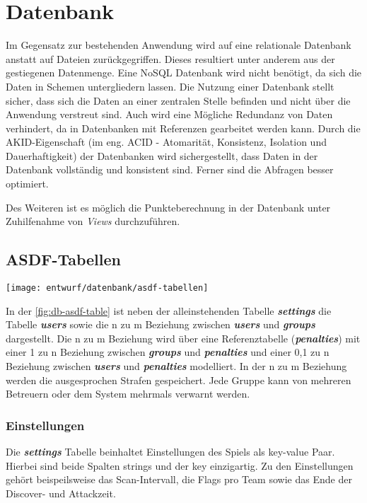 \section{Datenbank}
Im Gegensatz zur bestehenden Anwendung wird auf eine relationale Datenbank anstatt auf Dateien zurückgegriffen. Dieses resultiert unter anderem aus der gestiegenen Datenmenge. Eine NoSQL Datenbank wird nicht benötigt, da sich die Daten in Schemen untergliedern lassen. Die Nutzung einer Datenbank stellt sicher, dass sich die Daten an einer zentralen Stelle befinden und nicht über die Anwendung verstreut sind. Auch wird eine Mögliche Redundanz von Daten verhindert, da in Datenbanken mit Referenzen gearbeitet werden kann. Durch die AKID-Eigenschaft (im eng. ACID - Atomarität, Konsistenz, Isolation und Dauerhaftigkeit) der Datenbanken wird sichergestellt, dass Daten in der Datenbank vollständig und konsistent sind. Ferner sind die Abfragen besser optimiert.

Des Weiteren ist es möglich die Punkteberechnung in der Datenbank unter Zuhilfenahme von \textit{Views} durchzuführen.

\subsection{ASDF-Tabellen}
\begin{center}
	\texttt{[image: entwurf/datenbank/asdf-tabellen]}
	\label{fig:db-asdf-table}
\end{center}

In der \autoref{fig:db-asdf-table} ist neben der alleinstehenden Tabelle \textbf{\textit{settings}} die Tabelle \textbf{\textit{users}} sowie die n zu m Beziehung zwischen \textbf{\textit{users}} und \textbf{\textit{groups}} dargestellt. Die n zu m Beziehung wird über eine Referenztabelle (\textbf{\textit{penalties}}) mit einer 1 zu n Beziehung zwischen \textbf{\textit{groups}} und \textbf{\textit{penalties}} und einer 0,1 zu n Beziehung zwischen \textbf{\textit{users}} und \textbf{\textit{penalties}} modelliert. In der n zu m Beziehung werden die ausgesprochen Strafen gespeichert. Jede Gruppe kann von mehreren Betreuern oder dem System mehrmals verwarnt werden.

\subsubsection{Einstellungen}
Die \textbf{\textit{settings}} Tabelle beinhaltet Einstellungen des Spiels als key-value Paar. Hierbei sind beide Spalten strings und der key einzigartig. Zu den Einstellungen gehört beispeilsweise das Scan-Intervall, die Flags pro Team sowie das Ende der Discover- und Attackzeit.

